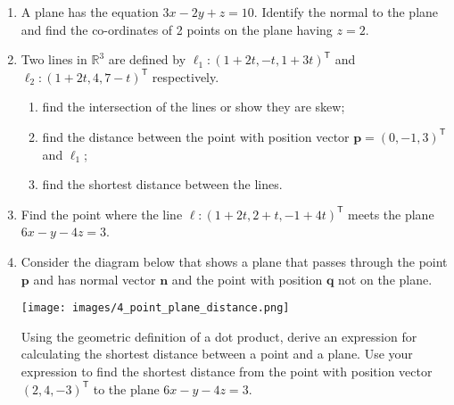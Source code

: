 \documentclass[a4paper,11pt]{article}
\begin{document}
\begin{enumerate}[label=4.\arabic*]
    \item A plane has the equation $3x - 2y + z = 10$. Identify the normal to the plane and find the co-ordinates of 2 points on the plane having $z = 2$.
    
    \item Two lines in $\mathbb{R}^3$ are defined by $\ell_1: (1 + 2t, -t, 1 + 3t)^\mathsf{T}$ and $\ell_2: (1 + 2t, 4, 7 - t)^\mathsf{T}$ respectively.
    \begin{enumerate}
        \item find the intersection of the lines or show they are skew;
        \item find the distance between the point with position vector $\mathbf{p} = (0, -1, 3)^\mathsf{T}$ and $\ell_1$;
        \item find the shortest distance between the lines.
    \end{enumerate}

    \item Find the point where the line $\ell:(1 + 2t, 2 + t, -1 + 4t)^\mathsf{T}$ meets the plane $6x - y - 4z = 3$. 
    
    \item Consider the diagram below that shows a plane that passes through the point $\mathbf{p}$ and has normal vector $\mathbf{n}$ and the point with position $\mathbf{q}$ not on the plane. 
    \begin{center}
        \texttt{[image: images/4\_point\_plane\_distance.png]}
    \end{center}
    Using the geometric definition of a dot product, derive an expression for calculating the shortest distance between a point and a plane. Use your expression to find the shortest distance from the point with position vector $(2, 4, -3)^\mathsf{T}$ to the plane $6x - y - 4z = 3$.
\end{enumerate}
\end{document}

